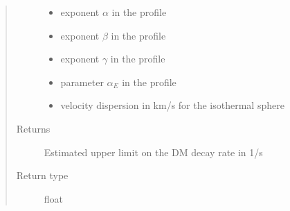 \documentclass[letterpaper,10pt,english]{sphinxmanual}
\begin{document}
\begin{fulllineitems}
\begin{quote}
\begin{description}
\begin{itemize}
\item {} 
\sphinxAtStartPar
{} \textendash{} exponent \(\alpha\) in the {\hyperref[\detokenize{diffsph.profiles:diffsph.profiles.templates.hdz}]{}} profile

\item {} 
\sphinxAtStartPar
{} \textendash{} exponent \(\beta\) in the {\hyperref[\detokenize{diffsph.profiles:diffsph.profiles.templates.hdz}]{}} profile

\item {} 
\sphinxAtStartPar
{} \textendash{} exponent \(\gamma\) in the {\hyperref[\detokenize{diffsph.profiles:diffsph.profiles.templates.hdz}]{}} profile

\item {} 
\sphinxAtStartPar
{} \textendash{} parameter \(\alpha_E\) in the {\hyperref[\detokenize{diffsph.profiles:diffsph.profiles.templates.enst}]{}} profile

\item {} 
\sphinxAtStartPar
{} \textendash{} velocity dispersion in km/s for the isothermal sphere {\hyperref[\detokenize{diffsph.profiles:diffsph.profiles.templates.sis}]{}}

\end{itemize}

\item[{Returns}] \leavevmode
\sphinxAtStartPar
Estimated upper limit on the DM decay rate in 1/s

\item[{Return type}] \leavevmode
\sphinxAtStartPar
float

\end{description}\end{quote}

\end{fulllineitems}

\end{document}
